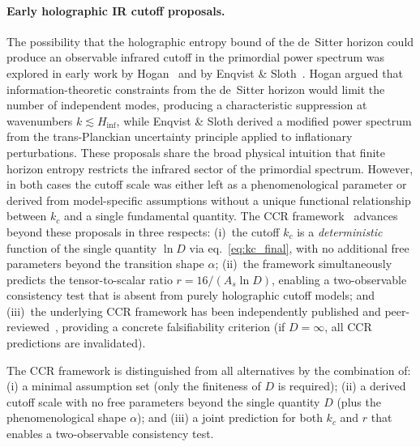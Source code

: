 \paragraph{Early holographic IR cutoff proposals.}
The possibility that the holographic entropy bound of the de~Sitter
horizon could produce an observable infrared cutoff in the primordial
power spectrum was explored in early work by
Hogan~\cite{Hogan:2002,Hogan:2005} and by Enqvist \&
Sloth~\cite{Enqvist:2002}. Hogan argued that information-theoretic
constraints from the de~Sitter horizon would limit the number of
independent modes, producing a characteristic suppression at
wavenumbers $k \lesssim H_{\mathrm{inf}}$, while Enqvist \& Sloth
derived a modified power spectrum from the trans-Planckian uncertainty
principle applied to inflationary perturbations. These proposals share
the broad physical intuition that finite horizon entropy restricts the
infrared sector of the primordial spectrum. However, in both cases
the cutoff scale was either left as a phenomenological parameter or
derived from model-specific assumptions without a unique functional
relationship between $k_c$ and a single fundamental quantity.
%
The CCR framework~\cite{Chronis:2026} advances beyond these proposals
in three respects: (i)~the cutoff $k_c$ is a \emph{deterministic}
function of the single quantity $\ln D$ via
eq.~\eqref{eq:kc_final}, with no additional free parameters beyond
the transition shape $\alpha$; (ii)~the framework simultaneously
predicts the tensor-to-scalar ratio $r = 16/(A_s \ln D)$, enabling a
two-observable consistency test that is absent from purely holographic
cutoff models; and (iii)~the underlying CCR framework has been
independently published and peer-reviewed~\cite{Chronis:2026},
providing a concrete falsifiability criterion (if $D = \infty$, all
CCR predictions are invalidated).

The CCR framework is distinguished from all alternatives by the
combination of: (i) a minimal assumption set (only the finiteness of
$D$ is required); (ii) a derived cutoff scale with no free parameters
beyond the single quantity $D$ (plus the phenomenological shape
$\alpha$); and (iii) a joint prediction for both $k_c$ and $r$ that
enables a two-observable consistency test.

